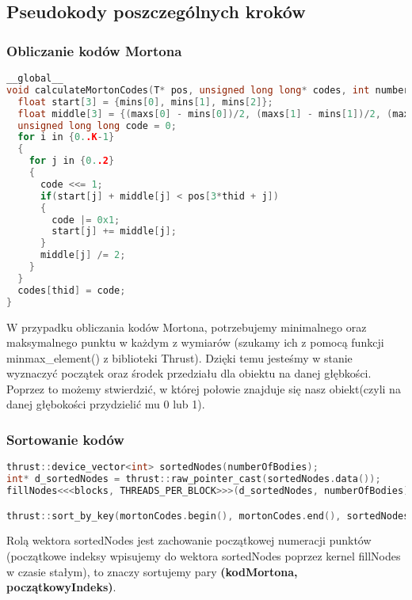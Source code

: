 \documentclass[14pt,twoside,a4paper]{article}
\theoremstyle{definition}
\begin{document}
\subsection{\Large Pseudokody poszczególnych kroków}
\subsubsection{\large Obliczanie kodów Mortona}
\begin{lstlisting}[language=C++, frame=single, framerule=2pt, caption=Krok 1]
__global__
void calculateMortonCodes(T* pos, unsigned long long* codes, int numberOfBodies, T* mins, T* maxs) {
  float start[3] = {mins[0], mins[1], mins[2]};
  float middle[3] = {(maxs[0] - mins[0])/2, (maxs[1] - mins[1])/2, (maxs[2] - mins[2])/2};
  unsigned long long code = 0;
  for i in {0..K-1} 
  {
    for j in {0..2}
    {
      code <<= 1;
      if(start[j] + middle[j] < pos[3*thid + j]) 
      {
        code |= 0x1;
        start[j] += middle[j];
      }
      middle[j] /= 2;
    }
  }
  codes[thid] = code;
}
\end{lstlisting}
W przypadku obliczania kodów Mortona, potrzebujemy minimalnego oraz maksymalnego punktu w każdym z wymiarów (szukamy ich z pomocą funkcji minmax\_element() z biblioteki Thrust). Dzięki temu jesteśmy w stanie wyznaczyć początek oraz środek przedziału dla obiektu na danej głębkości. Poprzez to możemy stwierdzić, w której połowie znajduje się nasz obiekt(czyli na danej głębokości przydzielić mu 0 lub 1).

\subsubsection{\large Sortowanie kodów}
\begin{lstlisting}[language=C++, frame=single, framerule=2pt, caption=Krok 2]
thrust::device_vector<int> sortedNodes(numberOfBodies);
int* d_sortedNodes = thrust::raw_pointer_cast(sortedNodes.data());
fillNodes<<<blocks, THREADS_PER_BLOCK>>>(d_sortedNodes, numberOfBodies);

thrust::sort_by_key(mortonCodes.begin(), mortonCodes.end(), sortedNodes.begin());  
\end{lstlisting}
\bigskip
Rolą wektora sortedNodes jest zachowanie początkowej numeracji punktów (początkowe indeksy wpisujemy do wektora sortedNodes poprzez kernel fillNodes w czasie stałym), to znaczy sortujemy pary \textbf{(kodMortona, początkowyIndeks)}.
\end{document}
